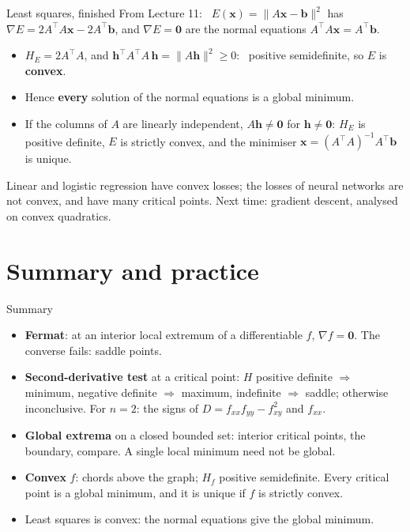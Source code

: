 \documentclass[10pt]{wosm-slides}
\newcommand{\norm}[1]{\lVert #1 \rVert}
\newcommand{\vx}{\mathbf{x}}
\newcommand{\vb}{\mathbf{b}}
\newcommand{\vh}{\mathbf{h}}
\begin{document}
\begin{frame}{Least squares, finished}
  From Lecture 11: \ $E(\vx) = \norm{A\vx - \vb}^2$ has $\nabla E = 2A^\top A\vx - 2A^\top\vb$, and
  $\nabla E = \mathbf 0$ are the normal equations $A^\top A\vx = A^\top\vb$.
  \pause
  \begin{itemize}
    \item $H_E = 2A^\top A$, and $\vh^\top A^\top A\, \vh = \norm{A\vh}^2 \ge 0$: \ positive
      semidefinite, so $E$ is \textbf{convex}.
    \item Hence \textbf{every} solution of the normal equations is a global minimum.
    \pause
    \item If the columns of $A$ are linearly independent, $A\vh \ne \mathbf 0$ for $\vh \ne \mathbf 0$:
      $H_E$ is positive definite, $E$ is strictly convex, and the minimiser
      $\vx = (A^\top A)^{-1} A^\top \vb$ is unique.
  \end{itemize}
  \pause
  \begin{remark}
    Linear and logistic regression have convex losses; the losses of neural networks are not
    convex, and have many critical points. Next time: gradient descent, analysed on convex
    quadratics.
  \end{remark}
\end{frame}

\section{Summary and practice}

\begin{frame}{Summary}
  \begin{itemize}
    \item \textbf{Fermat}: at an interior local extremum of a differentiable $f$, $\nabla f = \mathbf 0$.
      The converse fails: saddle points.
    \item \textbf{Second-derivative test} at a critical point: $H$ positive definite $\Rightarrow$
      minimum, negative definite $\Rightarrow$ maximum, indefinite $\Rightarrow$ saddle; otherwise
      inconclusive. For $n = 2$: the signs of $D = f_{xx} f_{yy} - f_{xy}^2$ and $f_{xx}$.
    \item \textbf{Global extrema} on a closed bounded set: interior critical points, the boundary,
      compare. A single local minimum need not be global.
    \item \textbf{Convex} $f$: chords above the graph; $H_f$ positive semidefinite. Every critical
      point is a global minimum, and it is unique if $f$ is strictly convex.
    \item Least squares is convex: the normal equations give the global minimum.
  \end{itemize}
\end{frame}
\end{document}
